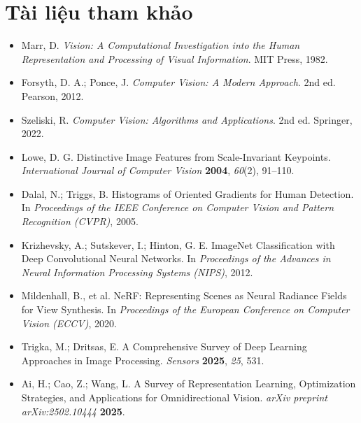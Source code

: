 \section*{Tài liệu tham khảo}
\begin{itemize}
    \item[1] Marr, D. \textit{Vision: A Computational Investigation into the Human Representation and Processing of Visual Information}. MIT Press, 1982.
    \item[2] Forsyth, D. A.; Ponce, J. \textit{Computer Vision: A Modern Approach}. 2nd ed. Pearson, 2012.
    \item[3] Szeliski, R. \textit{Computer Vision: Algorithms and Applications}. 2nd ed. Springer, 2022.
    \item[4] Lowe, D. G. Distinctive Image Features from Scale-Invariant Keypoints. \textit{International Journal of Computer Vision} \textbf{2004}, \textit{60}(2), 91–110.
    \item[5] Dalal, N.; Triggs, B. Histograms of Oriented Gradients for Human Detection. In \textit{Proceedings of the IEEE Conference on Computer Vision and Pattern Recognition (CVPR)}, 2005.
    \item[6] Krizhevsky, A.; Sutskever, I.; Hinton, G. E. ImageNet Classification with Deep Convolutional Neural Networks. In \textit{Proceedings of the Advances in Neural Information Processing Systems (NIPS)}, 2012.
    \item[7] Mildenhall, B., et al. NeRF: Representing Scenes as Neural Radiance Fields for View Synthesis. In \textit{Proceedings of the European Conference on Computer Vision (ECCV)}, 2020.
    \item[8] Trigka, M.; Dritsas, E. A Comprehensive Survey of Deep Learning Approaches in Image Processing. \textit{Sensors} \textbf{2025}, \textit{25}, 531.
    \item[9] Ai, H.; Cao, Z.; Wang, L. A Survey of Representation Learning, Optimization Strategies, and Applications for Omnidirectional Vision. \textit{arXiv preprint arXiv:2502.10444} \textbf{2025}.
\end{itemize}